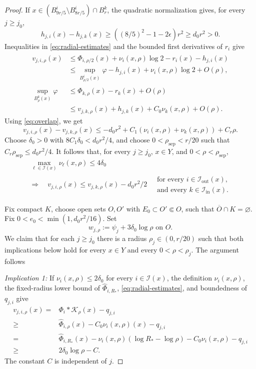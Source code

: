 \documentclass[reqno]{amsart}
\theoremstyle{remark}
\theoremstyle{plain}
\begin{document}
\begin{proof}
If \(x\in (B^i_{9r/5}\setminus B^i_{8r/5})\cap B^k_r\), the quadratic normalization gives, for every $j\ge j_0$,
\[
h_{j,i}(x)-h_{j,k}(x)
\ge((8/5)^2-1-2\epsilon)r^2\ge d_0r^2>0.
\]
Inequalities in \eqref{eq:radial-estimates} and the bounded first derivatives of \(r_i\) give
\[
\begin{aligned}
v_{j,i,\rho}(x)
&\le \widehat{\Phi}_{i,\rho/2}(x)+\nu_i(x,\rho)\log2-r_i(x)-h_{j,i}(x)\\
&\le\sup_{B^i_{\rho/2}(x)}\varphi-h_{j,i}(x)+\nu_i(x,\rho)\log2+O(\rho),\\
\sup_{B^k_\rho(x)}\varphi
&\le \widehat{\Phi}_{k,\rho}(x)-r_k(x)+O(\rho)\\
&\le v_{j,k,\rho}(x)+h_{j,k}(x)+C_0\nu_k(x,\rho)+O(\rho).
\end{aligned}
\]
Using \eqref{eq:overlap}, we get 
\[
v_{j,i,\rho}(x)-v_{j,k,\rho}(x)
\le-d_0r^2+C_1(\nu_i(x,\rho)+\nu_k(x,\rho))+C_r\rho.
\]
Choose \(\delta_0>0\) with \(8C_1\delta_0<d_0r^2/4\), and choose \(0<\rho_{\mathrm{sep}}<r/20\) such that \(C_r\rho_{\mathrm{sep}}\le d_0r^2/4\). It follows that, for every \(j\ge j_0\), \(x\in Y\), and \(0<\rho<\rho_{\mathrm{sep}}\),
\begin{equation}\label{eq:branch-comparison}
\begin{gathered}
\max_{\ell\in\mathcal I(x)}\nu_\ell(x,\rho)\le4\delta_0\\
\Longrightarrow\quad
v_{j,i,\rho}(x)\le v_{j,k,\rho}(x)-d_0r^2/2
\quad
\begin{matrix}
\text{for every }i\in\mathcal I_{\mathrm{out}}(x),\\
\text{and every }k\in\mathcal I_{\mathrm{in}}(x).
\end{matrix}
\end{gathered}
\end{equation}

Fix compact \(K\), choose open sets $O,O'$ with \(E_0\subset O'\Subset O\), such that  \(\overline O\cap K=\varnothing\).  Fix $
0<e_0<\min(1,d_0r^2/16)$. Set
\[
w_{j,\rho}:=\psi_j+3\delta_0\log\rho\text{ on }O.
\]
We claim that for each \(j\ge j_0\) there is a radius \(\rho_j\in(0,r/20)\) such that both implications below hold for every \(x\in Y\) and every \(0<\rho<\rho_j\). The argument follows \cite[Proposition 4.1(1)--(2)]{Chen21}


\emph{Implication 1:}
If \(\nu_i(x,\rho)\le2\delta_0\) for every \(i\in\mathcal I(x)\), the definition $\nu_i(x,\rho)$, the fixed-radius lower bound of $\widehat{\Phi}_{i,R_*}$, \eqref{eq:radial-estimates}, and boundedness of \(q_{j,i}\) give
\[\begin{aligned}
v_{j,i,\rho}(x)=&\Phi_i*\mathcal{K_\rho}(x)-q_{j,i}\\
\ge&\widehat{\Phi}_{i,\rho}(x)-C_0\nu_{i}(x,\rho)(x)-q_{j,i}\\
=&\widehat{\Phi}_{i,R_*}(x)-\nu_i(x,\rho)(\log R_*-\log\rho)-C_0\nu_i(x,\rho)-q_{j,i}\\
\ge&
2\delta_0\log\rho-C.
\end{aligned}
\]The constant \(C\) is independent of \(j\).


\end{proof}
\end{document}
